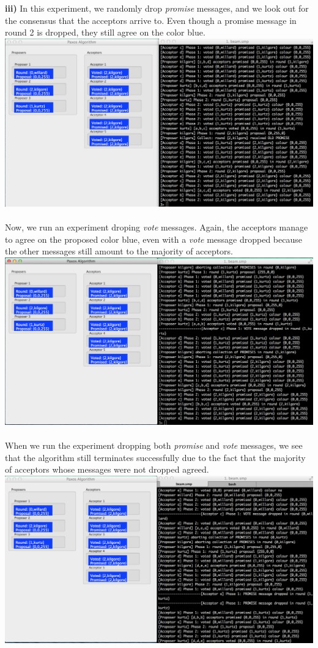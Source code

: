 \documentclass[a4paper, 11pt]{article}
\begin{document}
\textbf{iii)} In this experiment, we randomly drop \textit{promise} messages, and we look out for the consensus that the acceptors arrive to. Even though a promise message in round 2 is dropped, they still agree on the color blue.\\
\includegraphics[scale=0.35]{images/exp5.png} \\\\
Now, we run an experiment droping \textit{vote} messages. Again, the acceptors manage to agree on the proposed color blue, even with a \textit{vote} message dropped because the other messages still amount to the majority of acceptors.\\
\includegraphics[scale=0.35]{images/exp6.png} \\\\
When we run the experiment dropping both \textit{promise} and \textit{vote} messages, we see that the algorithm still terminates successfully due to the fact that the majority of acceptors whose messages were not dropped agreed.\\
\includegraphics[scale=0.35]{images/exp7.png} \\\\
\end{document}
